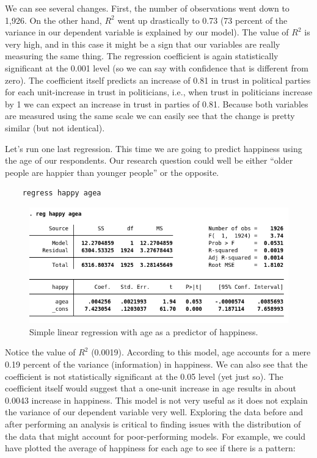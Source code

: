 We can see several changes. First, the number of observations went down to 1,926. On the other hand, $R^2$ went up drastically to 0.73 (73 percent of the variance in our dependent variable is explained by our model). The value of $R^2$ is very high, and in this case it might be a sign that our variables are really measuring the same thing. The regression coefficient is again statistically significant at the 0.001 level (so we can say with confidence that is different from zero). The coefficient itself predicts an increase of 0.81 in trust in political parties for each unit-increase in trust in politicians, i.e., when trust in politicians increase by 1 we can expect an increase in trust in parties of 0.81. Because both variables are measured using the same scale we can easily see that the change is pretty similar (but not identical).

Let's run one last regression. This time we are going to predict happiness using the age of our respondents. Our research question could well be either ``older people are happier than younger people'' or the opposite.

\begin{lstlisting}
	regress happy agea
\end{lstlisting}

\begin{figure}[H]
	\includegraphics[width=\linewidth]{./img/reg3.png}
	\caption{Simple linear regression with age as a predictor of happiness.}
\end{figure}

Notice the value of $R^2$ (0.0019). According to this model, age accounts for a mere 0.19 percent of the variance (information) in happiness. We can also see that the coefficient is not statistically significant at the 0.05 level (yet just so). The coefficient itself would suggest that a one-unit increase in age results in about 0.0043 increase in happiness. This model is not very useful as it does not explain the variance of our dependent variable very well. Exploring the data before and after performing an analysis is critical to finding issues with the distribution of the data that might account for poor-performing models. For example, we could have plotted the average of happiness for each age to see if there is a pattern:

